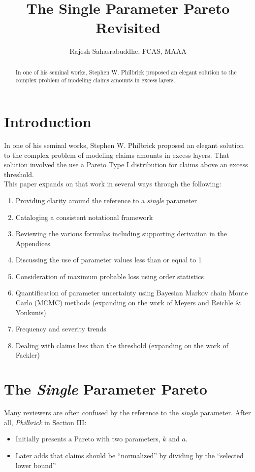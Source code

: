 \documentclass[]{article} %
\title{The Single Parameter Pareto Revisited}
\author{Rajesh Sahasrabuddhe, FCAS, MAAA}
\begin{document}
\maketitle

\begin{abstract}
In one of his seminal works, Stephen W. Philbrick proposed an elegant solution to the complex problem of modeling claims amounts in excess layers. 

\end{abstract}

\section{Introduction}
In one of his seminal works, Stephen W. Philbrick\cite{Philbrick} proposed an elegant solution to the complex problem of modeling claims amounts in excess layers. That solution involved the use a Pareto Type I distribution for claims above an excess threshold.\\

This paper expands on that work in several ways through the following:
\begin{enumerate}
	\item Providing clarity around the reference to a \emph{single} parameter
	\item Cataloging a consistent notational framework
	\item Reviewing the various formulas including supporting derivation in the Appendices
	\item Discussing the use of parameter values less than or equal to 1
	\item Consideration of maximum probable loss using order statistics
	\item Quantification of parameter uncertainty using Bayesian Markov chain Monte Carlo (MCMC) methods (expanding on the work of Meyers and Reichle \& Yonkunis)
	\item Frequency and severity trends
	\item Dealing with claims less than the threshold (expanding on the work of Fackler)
\end{enumerate}
\section{The \emph{Single} Parameter Pareto}
Many reviewers are often confused by the reference to the \emph{single} parameter. After all, \emph{Philbrick} in Section III:
\begin{itemize}
\item Initially presents a Pareto with two parameters, $k$ and $a$.
\item Later adds that claims should be ``normalized'' by dividing by the ``selected lower bound''
\end{itemize}
\end{document}
